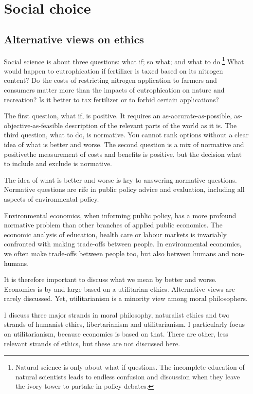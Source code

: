 \chapter{Social choice}
\label{ch:socialchoice}

\section{Alternative views on ethics}
Social science is about three questions: what if; so what; and what to do.\footnote{Natural science is only about what if questions. The incomplete education of natural scientists leads to endless confusion and discussion when they leave the ivory tower to partake in policy debates.} What would happen to eutrophication if fertilizer is taxed based on its nitrogen content? Do the costs of restricting nitrogen application to farmers and consumers matter more than the impacts of eutrophication on nature and recreation? Is it better to tax fertilizer or to forbid certain applications?

The first question, what if, is positive. It requires an as-accurate-as-possible, as-objective-as-feasible description of the relevant parts of the world as it is. The third question, what to do, is normative. You cannot rank options without a clear idea of what is better and worse. The second question is a mix of normative and positive\textemdash the measurement of costs and benefits is positive, but the decision what to include and exclude is normative.

The idea of what is better and worse is key to answering normative questions. Normative questions are rife in public policy advice and evaluation, including all aspects of environmental policy.

Environmental economics, when informing public policy, has a more profound normative problem than other branches of applied public economics. The economic analysis of education, health care or labour markets is invariably confronted with making trade-offs between people. In environmental economics, we often make trade-offs between people too, but also between humans and non-humans.

It is therefore important to discuss what we mean by better and worse. Economics is by and large based on a utilitarian ethics. Alternative views are rarely discussed. Yet, utilitarianism is a minority view among moral philosophers.

I discuss three major strands in moral philosophy, naturalist ethics and two strands of humanist ethics, libertarianism and utilitarianism. I particularly focus on utilitarianism, because economics is based on that. There are other, less relevant strands of ethics, but these are not discussed here.

